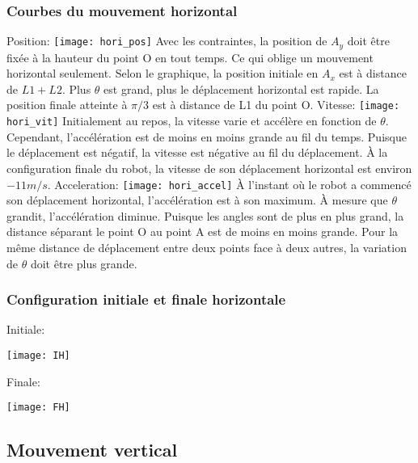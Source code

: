\documentclass{article}
\begin{document}
\subsubsection{Courbes du mouvement horizontal}
Position:
\newline
\noindent \texttt{[image: hori\_pos]}
Avec les contraintes, la position de $A_y$ doit être fixée à la hauteur du point O en tout temps. Ce qui oblige un mouvement horizontal seulement. Selon le graphique, la position initiale en $A_x$ est à distance de $L1 + L2$. Plus $\theta$ est grand, plus le déplacement horizontal est rapide. La position finale atteinte à $\pi/3$ est à distance de L1 du point O.
\newline
\newline
\noindent Vitesse:
\newline
\noindent \texttt{[image: hori\_vit]}
Initialement au repos, la vitesse varie et accélère en fonction de $\theta$. Cependant, l'accélération est de moins en moins grande au fil du temps. Puisque le déplacement est négatif, la vitesse est négative au fil du déplacement. À la configuration finale du robot, la vitesse de son déplacement horizontal est environ $-11 m/s$.
\newline
\newline
\noindent Acceleration:
\newline
\noindent \texttt{[image: hori\_accel]}
À l'instant où le robot a commencé son déplacement horizontal, l'accélération est à son maximum. À mesure que $\theta$ grandit, l'accélération diminue. Puisque les angles sont de plus en plus grand, la distance séparant le point O au point A est de moins en moins grande. Pour la même distance de déplacement entre deux points face à deux autres, la variation de $\theta$ doit être plus grande.

\subsubsection{Configuration initiale et finale horizontale}
Initiale:
\newline
\centerline{\noindent \texttt{[image: IH]}}
\newline
\newline
\noindent Finale:
\newline
\centerline{\noindent \texttt{[image: FH]}}
\newline

\subsection{Mouvement vertical}
\end{document}
